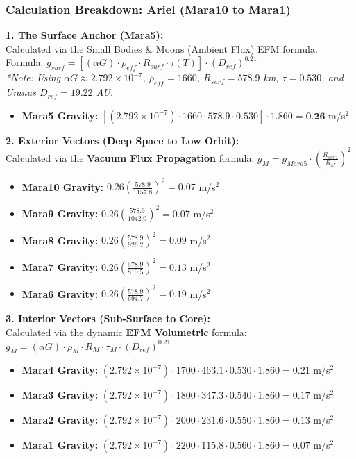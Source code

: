 \documentclass[11pt, a4paper]{article}
\begin{document}
\clearpage
\subsubsection{Calculation Breakdown: Ariel (Mara10 to Mara1)}

\noindent \textbf{1. The Surface Anchor (Mara5):} \\
Calculated via the Small Bodies \& Moons (Ambient Flux) EFM formula. \\
Formula: $g_{surf} = \left[ (\alpha G) \cdot \rho_{eff} \cdot R_{surf} \cdot \tau(T) \right] \cdot (D_{ref})^{0.21}$ \\
\textit{*Note: Using $\alpha G \approx 2.792 \times 10^{-7}$, $\rho_{eff} = 1660$, $R_{surf} = 578.9$ km, $\tau = 0.530$, and Uranus $D_{ref} = 19.22$ AU.}
\begin{itemize}
  \item \textbf{Mara5 Gravity:} $\left[ (2.792 \times 10^{-7}) \cdot 1660 \cdot 578.9 \cdot 0.530 \right] \cdot 1.860 = \textbf{0.26}$ m/s$^2$
\end{itemize}

\vspace{0.5em}
\noindent \textbf{2. Exterior Vectors (Deep Space to Low Orbit):} \\
Calculated via the \textbf{Vacuum Flux Propagation} formula: $g_M = g_{Mara5} \cdot \left( \frac{R_{surf}}{R_M} \right)^2$
\begin{itemize}
  \item \textbf{Mara10 Gravity:} $0.26 \left( \frac{578.9}{1157.8} \right)^2 = 0.07$ m/s$^2$
  \item \textbf{Mara9 Gravity:} $0.26 \left( \frac{578.9}{1042.0} \right)^2 = 0.07$ m/s$^2$
  \item \textbf{Mara8 Gravity:} $0.26 \left( \frac{578.9}{926.2} \right)^2 = 0.09$ m/s$^2$
  \item \textbf{Mara7 Gravity:} $0.26 \left( \frac{578.9}{810.5} \right)^2 = 0.13$ m/s$^2$
  \item \textbf{Mara6 Gravity:} $0.26 \left( \frac{578.9}{694.7} \right)^2 = 0.19$ m/s$^2$
\end{itemize}

\vspace{0.5em}
\noindent \textbf{3. Interior Vectors (Sub-Surface to Core):} \\
Calculated via the dynamic \textbf{EFM Volumetric} formula: $g_M = (\alpha G) \cdot \rho_{M} \cdot R_M \cdot \tau_M \cdot (D_{ref})^{0.21}$
\begin{itemize}
  \item \textbf{Mara4 Gravity:} $(2.792 \times 10^{-7}) \cdot 1700 \cdot 463.1 \cdot 0.530 \cdot 1.860 = 0.21$ m/s$^2$
  \item \textbf{Mara3 Gravity:} $(2.792 \times 10^{-7}) \cdot 1800 \cdot 347.3 \cdot 0.540 \cdot 1.860 = 0.17$ m/s$^2$
  \item \textbf{Mara2 Gravity:} $(2.792 \times 10^{-7}) \cdot 2000 \cdot 231.6 \cdot 0.550 \cdot 1.860 = 0.13$ m/s$^2$
  \item \textbf{Mara1 Gravity:} $(2.792 \times 10^{-7}) \cdot 2200 \cdot 115.8 \cdot 0.560 \cdot 1.860 = 0.07$ m/s$^2$
\end{itemize}
\end{document}
